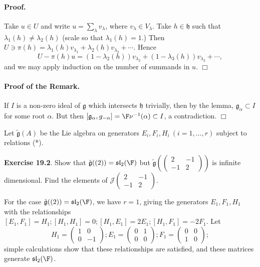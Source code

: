 \documentclass[11pt]{article}
\newcommand{\sll}{\mathfrak{sl}}
\newcommand{\g}{\mathfrak{g}}
\newcommand{\h}{\mathfrak{h}}
\newcommand{\sk}{\vspace*{1em}}
\begin{document}
\paragraph{Proof.} Take $u \in U$ and write $u = \sum_\lambda v_{\lambda}$,
where $v_\lambda \in V_\lambda$.  Take $h \in \h$ such that 
$\lambda_1(h) \neq \lambda_2(h)$
(scale so that $\lambda_1(h) = 1$.)  Then $U \ni \pi(h) =
\lambda_1(h) v_{\lambda_1} + \lambda_2(h) v_{\lambda_2} + \cdots$.
Hence 
\[U - \pi(h)u = (1-\lambda_2(h)) v_{\lambda_2} + (1-\lambda_3(h))
v_{\lambda_3} + \cdots,\]
and we may apply induction on the number of summands in $u$.
$\Box$  

\paragraph{Proof of the Remark.} If $I$ is a non-zero ideal of $\g$
which intersects $\h$ trivially, then by the lemma, $\g_\alpha \subset
I$ for some root $\alpha$.  But then $[\g_\alpha, g_{-\alpha}] =
\F \nu^{-1}(\alpha) \subset I$, a contradiction. $\Box$

Let $\tilde{\g}(A)$ be the Lie algebra on generators $E_i, F_i, H_i
\ (i=1, \ldots, r)$ subject to relations (*). 

\sk\noindent
{\bf Exercise 19.2}. Show that $\tilde{\g}((2)) = \sll_2(\F)$
but $\tilde{\g}\left(\left(\begin{array}{rr} 2 & -1 \\ -1 & 2 \end{array}
\right) \right)$ is infinite dimensional.  Find the elements of
$\mathcal{J}\left(\begin{array}{rr} 2 & -1 \\ -1 & 2 \end{array}
\right)$.

\sk{}
For the case $\tilde{\g}((2)) = \sll_2(\F)$, we have $r=1$, giving the
generators $E_1, F_1, H_1$ with the relationships $[E_1, F_1] = H_1;
[H_1, H_1] = 0; [H_1, E_1] = 2E_1; [H_1, F_1] = -2F_1$.
Let 
\[
H_1 = \left( \begin{array}{cc} 1 & 0 \\ 0 & -1 \end{array} \right);
E_1 = \left( \begin{array}{cc} 0 & 1 \\ 0 & 0 \end{array} \right);
F_1 = \left( \begin{array}{cc} 0 & 0 \\ 1 & 0 \end{array} \right);
\]
simple calculations show that these relationships are satisfied,
and these matrices generate $\sll_2(\F)$.
\end{document}
